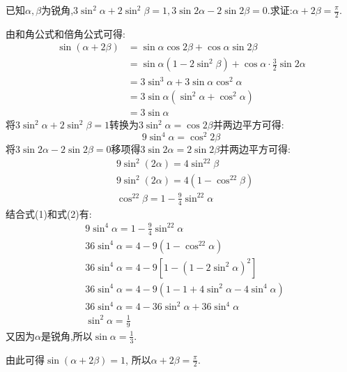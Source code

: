 \begin{questions}
	\question[20] 已知$\alpha,\beta$为锐角,$3\sin^2\alpha + 2\sin^2\beta=1, 3\sin2\alpha - 2\sin2\beta
		=0$.求证:$\alpha+2\beta=\frac{\pi}2.$

	\begin{proofsolution}
		由和角公式和倍角公式可得:
		\begin{align*}
			\sin(\alpha + 2\beta) & = \sin\alpha\cos2\beta + \cos\alpha\sin2\beta                      \\
			                      & = \sin\alpha(1 - 2\sin^2\beta) + \cos\alpha\cdot\frac32\sin2\alpha \\
			                      & = 3\sin^3\alpha  + 3\sin\alpha\cos^2\alpha                         \\
			                      & = 3\sin\alpha(\sin^2\alpha + \cos^2\alpha)                         \\
			                      & = 3\sin\alpha
		\end{align*}
		将$3\sin^2\alpha + 2\sin^2\beta=1$转换为$3\sin^2\alpha=\cos2\beta$并两边平方可得:
		\begin{equation*}
			9\sin^4\alpha = \cos^2{2\beta} \tag{1}
		\end{equation*}
		将$3\sin2\alpha-2\sin2\beta=0$移项得$3\sin2\alpha=2\sin2\beta$并两边平方可得:
		\begin{align*}
			 & 9\sin^2(2\alpha)  = 4\sin^22\beta               \\
			 & 9\sin^2(2\alpha)  = 4(1-\cos^22\beta)           \\
			 & \cos^22\beta = 1 - \frac94\sin^22\alpha \tag{2}
		\end{align*}
		结合式(1)和式(2)有:
		\begin{align*}
			 & 9\sin^4\alpha = 1 - \frac94\sin^22\alpha                 \\
			 & 36\sin^4\alpha = 4 - 9(1-\cos^22\alpha)                  \\
			 & 36\sin^4\alpha = 4 - 9[1-(1-2\sin^2\alpha)^2]            \\
			 & 36\sin^4\alpha = 4 - 9(1-1+4\sin^2\alpha -4\sin^4\alpha) \\
			 & 36\sin^4\alpha = 4 - 36\sin^2\alpha + 36\sin^4\alpha     \\
			 & \sin^2\alpha = \frac19
		\end{align*}
		又因为$\alpha$是锐角,所以$\sin\alpha=\frac13$.

		由此可得$\sin(\alpha+2\beta) = 1$, 所以$\alpha+2\beta=\frac{\pi}{2}$.
	\end{proofsolution}


\end{questions}
